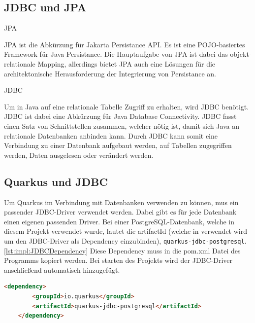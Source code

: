  
\subsection{JDBC und JPA}



\begin{compactitem}
    \item [JPA]
    \item JPA ist die Abkürzung für Jakarta Persistance API. Es ist eine POJO-basiertes Framework für Java Persistance. Die Hauptaufgabe von JPA ist dabei das objekt-relationale Mapping, allerdings bietet JPA auch eine Lösungen für die architektonische Herausforderung der Integrierung von Persistance an. 
    \item [JDBC]
    \item Um in Java auf eine relationale Tabelle Zugriff zu erhalten, wird JDBC benötigt. JDBC ist dabei eine Abkürzung für Java Database Connectivity. JDBC fasst einen Satz von Schnittstellen zusammen, welcher nötig ist, damit sich Java an relationale Datenbanken anbinden kann. Durch JDBC kann somit eine Verbindung zu einer Datenbank aufgebaut werden, auf Tabellen zugegriffen werden, Daten ausgelesen oder verändert werden.  
\end{compactitem}
\cite{quarkusHibernate}

\subsection{Quarkus und JDBC}
Um Quarkus im Verbindung mit Datenbanken verwenden zu können, mus ein passender JDBC-Driver verwendet werden. Dabei gibt es für jede Datenbank einen eigenen passenden Driver. Bei einer PostgreSQL-Datenbank, welche in diesem Projekt verwendet wurde, lautet die artifactId (welche in verwendet wird um den JDBC-Driver als Dependency einzubinden), \texttt{quarkus-jdbc-postgresql}. \ref{lst:impl:JDBCDependency} Diese Dependency muss in die pom.xml Datei des Programms kopiert werden. Bei starten des Projekts wird der JDBC-Driver anschließend automatisch hinzugefügt. \cite{quarkusHibernate}


\begin{lstlisting}[language=html,caption=JDBC Dependency,label=lst:impl:JDBCDependency]
    <dependency>
        <groupId>io.quarkus</groupId>
        <artifactId>quarkus-jdbc-postgresql</artifactId>
    </dependency>
  \end{lstlisting}

